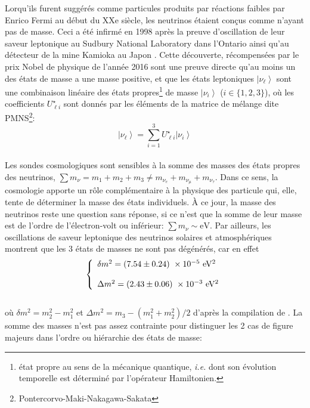 Lorqu'ils furent suggérés comme particules produits par réactions faibles par Enrico Fermi au début du XXe siècle, les neutrinos étaient conçus comme n'ayant pas de masse. Ceci a été infirmé en 1998 après la preuve d'oscillation de leur saveur leptonique au Sudbury National Laboratory dans l'Ontario ainsi qu'au détecteur de la mine Kamioka au Japon \citep{Fukuda1998, Kajita1999, Strumia2006db}. Cette découverte, récompensées par le prix Nobel de physique de l'année 2016 sont une preuve directe qu'au moins un des états de masse a une masse positive, et que les états leptoniques $\left\vert \nu_\ell \right\rangle$ sont une combinaison linéaire des états propres\footnote{état propre au sens de la mécanique quantique, \textit{i.e.} dont son évolution temporelle est déterminé par l'opérateur Hamiltonien.} de masse $\left\vert \nu_i \right\rangle$ ($i \in \lbrace 1, 2, 3 \rbrace$), où les coefficients $U_{\ell i}^\star$ sont donnés par les éléments de la matrice de mélange dite PMNS\footnote{Pontercorvo-Maki-Nakagawa-Sakata}: \\
\begin{equation}
\left\vert \nu_\ell \right\rangle = \sum_{i=1}^{3} U^\star_{\ell i} \left\vert \nu_i \right\rangle
\end{equation} \\ Les sondes cosmologiques sont sensibles à la somme des masses des états propres des neutrinos, $\sum m_\nu = m_1 + m_2 + m_3 \neq m_{\nu_e} + m_{\nu_\mu} + m_{\nu_\tau}$. Dans ce sens, la cosmologie apporte un rôle complémentaire à la physique des particule qui, elle, tente de déterminer la masse des états individuels. À ce jour, la masse des neutrinos reste une question sans réponse, si ce n'est que la somme de leur masse est de l'ordre de l'électron-volt ou inférieur: $\sum m_\nu \sim \mathrm{eV}$. Par ailleurs, les oscillations de saveur leptonique des neutrinos solaires et atmosphériques montrent que les 3 états de masses ne sont pas dégénérés, car en effet \\
\begin{equation}
\left\{
\begin{array}{l}
\delta m^2 = \left( 7.54\pm 0.24 \right) ~\times 10^{-5} ~{\rm eV^2} \\
\\
\Delta m^2 = \left( 2.43\pm 0.06 \right) ~\times 10^{-3} ~{\rm eV^2}
\end{array}
\right.
\end{equation} \\ où $\delta m^2 = m^2_2 - m^2_1$ et $\Delta m^2 = m_3 - (m^2_1 + m^2_2)/2$ d'après la compilation de \cite{Capozzi2013csa}. La somme des masses n'est pas assez contrainte pour distinguer les 2 cas de figure majeurs dans l'ordre ou hiérarchie des états de masse: \\

